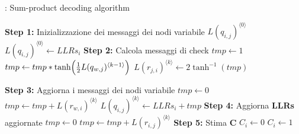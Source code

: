 \begin{algorithm} 
\caption{: Sum-product decoding algorithm}\label{al:sum-prod}
\begin{algorithmic}
\State \textbf{Step 1: }Inizializzazione dei messaggi dei nodi variabile $L(q_{i,j})^{\langle 0 \rangle}$
		\State $L(q_{i,j})^{\langle 0 \rangle} \leftarrow LLRs_i$
	\EndFor
\EndFor
{}
	\State \textbf{Step 2: } Calcola messaggi di check
		\State $tmp \leftarrow 1$
					\State $tmp \leftarrow tmp * \tanh \Bigl ( \frac{1}{2}L(q_{w,j})^{\langle k-1 \rangle} \Bigr ) $
				\EndIf
			\EndFor
		\State $L(r_{j,i})^{\langle k \rangle} \leftarrow 2 \tanh^{-1} (tmp)$
		\EndFor
	\EndFor
	
	\State \textbf{Step 3: }Aggiorna i messaggi dei nodi variabile 
		\State $tmp \leftarrow 0$
					\State $tmp \leftarrow tmp + L(r_{w,i})^{\langle k \rangle} $
				\EndIf
			\EndFor
		\State $L(q_{i,j})^{\langle k \rangle} \leftarrow LLRs_i + tmp$
		\EndFor
	\EndFor
\State  \textbf{Step 4: }Aggiorna \textbf{LLRs} aggiornate
	\State $tmp \leftarrow 0$
		\State $tmp \leftarrow tmp + L(r_{i,j})^{\langle k \rangle}$
	\EndFor
\EndFor
\EndFor
\State \textbf{Step 5: }Stima \textbf{C}
		\State$C_i \leftarrow 0$
	\Else
		\State$C_i \leftarrow 1$
	\EndIf
\EndFor

\end{algorithmic}
\end{algorithm}








